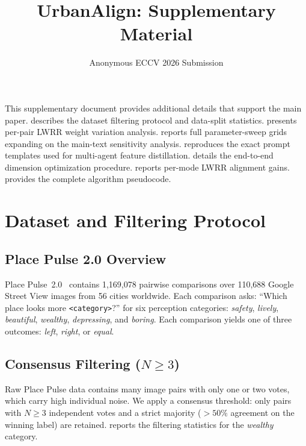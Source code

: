 \documentclass[runningheads]{llncs}
\begin{document}
\title{UrbanAlign: Supplementary Material}
\author{Anonymous ECCV 2026 Submission}
\maketitle

This supplementary document provides additional details that support the main paper.
 describes the dataset filtering protocol and data-split statistics.
 presents per-pair LWRR weight variation analysis.
 reports full parameter-sweep grids expanding on the main-text sensitivity analysis.
 reproduces the exact prompt templates used for multi-agent feature distillation.
 details the end-to-end dimension optimization procedure.
 reports per-mode LWRR alignment gains.
 provides the complete algorithm pseudocode.


\section{Dataset and Filtering Protocol}
\label{sec:dataset}

\subsection{Place Pulse 2.0 Overview}

Place Pulse~2.0~\cite{salesses2013collaborative} contains 1,169,078 pairwise comparisons over 110,688 Google Street View images from 56 cities worldwide.
Each comparison asks: ``Which place looks more \texttt{<category>}?'' for six perception categories: \emph{safety}, \emph{lively}, \emph{beautiful}, \emph{wealthy}, \emph{depressing}, and \emph{boring}.
Each comparison yields one of three outcomes: \emph{left}, \emph{right}, or \emph{equal}.

\subsection{Consensus Filtering ($N \geq 3$)}

Raw Place Pulse data contains many image pairs with only one or two votes, which carry high individual noise.
We apply a consensus threshold: only pairs with $N \geq 3$ independent votes and a strict majority ($> 50\%$ agreement on the winning label) are retained.
 reports the filtering statistics for the \emph{wealthy} category.
\end{document}
